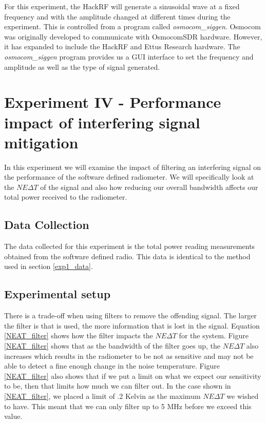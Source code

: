 For this experiment, the HackRF will generate a sinusoidal wave at a fixed frequency and with the amplitude changed at different times during the experiment.  This is controlled from a program called \emph{osmocom_siggen}.  Osmocom was originally developed to communicate with OsmocomSDR hardware.  However, it has expanded to include the HackRF and Ettus Research hardware.  The \emph{osmocom_siggen} program provides us a GUI interface to set the frequency and amplitude as well as the type of signal generated.  

\section{Experiment IV - Performance impact of interfering signal mitigation}\label{Exp4}
In this experiment we will examine the impact of filtering an interfering signal on the performance of the software defined radiometer.  We will specifically look at the $NE\Delta T$ of the signal and also how reducing our overall bandwidth affects our total power received to the radiometer.

\subsection{Data Collection}

The data collected for this experiment is the total power reading measurements obtained from the software defined radio.  This data is identical to the method used in section \ref{exp1_data}.

\subsection{Experimental setup} \label{exp4_setup}


There is a trade-off when using filters to remove the offending signal.  The larger the filter is that is used, the more information that is lost in the signal.  Equation \ref{NEAT_filter} shows how the filter impacts the $NE\Delta T$ for the system.  Figure \ref{NEAT_filter} shows that as the bandwidth of the filter goes up, the $NE\Delta T$ also increases which results in the radiometer to be not as sensitive and may not be able to detect a fine enough change in the noise temperature.  Figure \ref{NEAT_filter} also shows that if we put a limit on what we expect our sensitivity to be, then that limits how much we can filter out.  In the case shown in \ref{NEAT_filter}, we placed a limit of .2 Kelvin as the maximum $NE\Delta T$ we wished to have.  This meant that we can only filter up to 5 MHz before we exceed this value.

